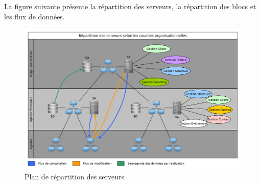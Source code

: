 La figure suivante présente la répartition des serveurs, la répartition des blocs et les flux de données.

\begin{figure}[H]
    \centering
    \includegraphics[scale=0.5]{figures/architectureServeurs.pdf}
    \caption{Plan de répartition des serveurs}
\end{figure}


\restoregeometry
